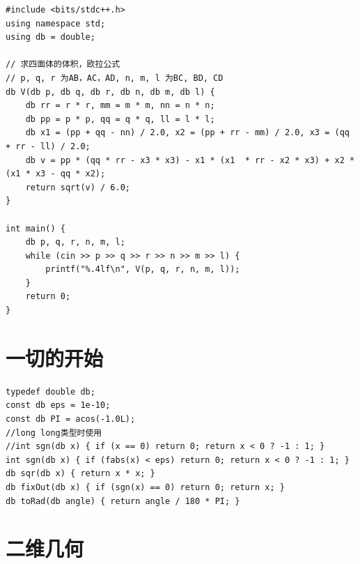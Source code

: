 \begin{lstlisting}
#include <bits/stdc++.h>
using namespace std;
using db = double;

// 求四面体的体积，欧拉公式
// p, q, r 为AB，AC，AD, n, m, l 为BC, BD, CD
db V(db p, db q, db r, db n, db m, db l) {
    db rr = r * r, mm = m * m, nn = n * n;
    db pp = p * p, qq = q * q, ll = l * l;
    db x1 = (pp + qq - nn) / 2.0, x2 = (pp + rr - mm) / 2.0, x3 = (qq + rr - ll) / 2.0;
    db v = pp * (qq * rr - x3 * x3) - x1 * (x1  * rr - x2 * x3) + x2 * (x1 * x3 - qq * x2);
    return sqrt(v) / 6.0;
}

int main() {
	db p, q, r, n, m, l;
	while (cin >> p >> q >> r >> n >> m >> l) {
		printf("%.4lf\n", V(p, q, r, n, m, l));
	}
	return 0;
}
\end{lstlisting}

\section{一切的开始}

\begin{lstlisting}
typedef double db;
const db eps = 1e-10;
const db PI = acos(-1.0L); 
//long long类型时使用
//int sgn(db x) { if (x == 0) return 0; return x < 0 ? -1 : 1; }
int sgn(db x) { if (fabs(x) < eps) return 0; return x < 0 ? -1 : 1; }
db sqr(db x) { return x * x; }
db fixOut(db x) { if (sgn(x) == 0) return 0; return x; }
db toRad(db angle) { return angle / 180 * PI; }
\end{lstlisting}

\section{二维几何}


